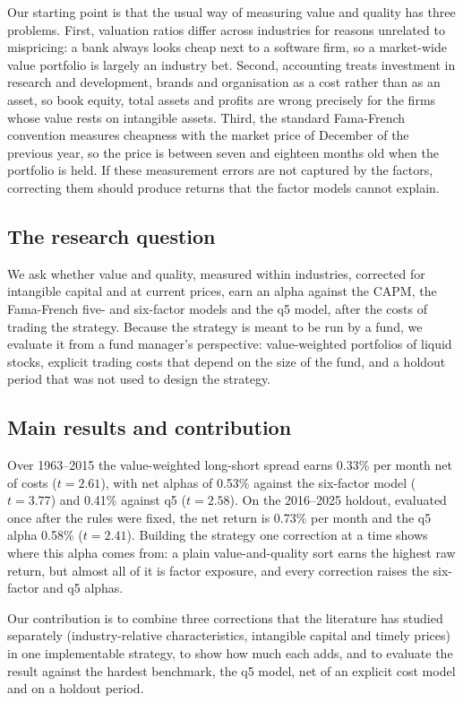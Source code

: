 \documentclass[12pt,a4paper]{article}
\begin{document}
Our starting point is that the usual way of measuring value and quality has three problems.
First, valuation ratios differ across industries for reasons unrelated to mispricing: a bank always
looks cheap next to a software firm, so a market-wide value portfolio is largely an industry bet.
Second, accounting treats investment in research and development, brands and organisation as a cost
rather than as an asset, so book equity, total assets and profits are wrong precisely for the firms
whose value rests on intangible assets. Third, the standard Fama-French convention measures
cheapness with the market price of December of the previous year, so the price is between seven and
eighteen months old when the portfolio is held. If these measurement errors are not captured by the
factors, correcting them should produce returns that the factor models cannot explain.

\subsection{The research question}

We ask whether value and quality, measured within industries, corrected for intangible capital and
at current prices, earn an alpha against the CAPM, the Fama-French five- and six-factor models and
the q5 model, after the costs of trading the strategy. Because the strategy is meant to be run by a
fund, we evaluate it from a fund manager's perspective: value-weighted portfolios of liquid stocks,
explicit trading costs that depend on the size of the fund, and a holdout period that was not used
to design the strategy.

\subsection{Main results and contribution}

Over 1963--2015 the value-weighted long-short spread earns 0.33\% per month net of costs
($t=2.61$), with net alphas of 0.53\% against the six-factor model ($t=3.77$) and 0.41\% against q5
($t=2.58$). On the 2016--2025 holdout, evaluated once after the rules were fixed, the net return is
0.73\% per month and the q5 alpha 0.58\% ($t=2.41$). Building the strategy one correction at a
time shows where this alpha comes from: a plain value-and-quality sort earns the highest raw return,
but almost all of it is factor exposure, and every correction raises the six-factor and q5 alphas.

Our contribution is to combine three corrections that the literature has studied separately
(industry-relative characteristics, intangible capital and timely prices) in one implementable
strategy, to show how much each adds, and to evaluate the result against the hardest benchmark,
the q5 model, net of an explicit cost model and on a holdout period.
\end{document}
